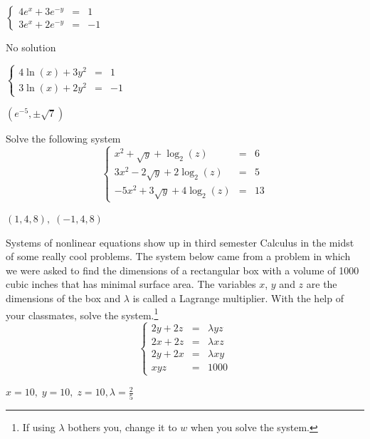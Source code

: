 \documentclass{ximera}
\begin{document}
\begin{question}
\begin{problem}
$\left\{\begin{array}{rcr}  4e^{x} + 3e^{-y} & = & 1 \\ 3e^{x} + 2e^{-y} & = & -1  \end{array} \right.$

\begin{solution}
    No solution
\end{solution}
\end{problem}

\begin{problem}\label{linearformlast}
$\left\{\begin{array}{rcr}  4\ln(x) + 3y^{2} & = & 1 \\ 3\ln(x) + 2y^{2} & = & -1 \end{array} \right.$   

\begin{solution}
    $\left( e^{-5}, \pm \sqrt{7} \right)$
\end{solution}
\end{problem}

\end{question}

\begin{problem}
Solve the following system \[\left\{\begin{array}{rcr}  x^{2} + \sqrt{y} + \log_{2}(z) & = & 6 \\[3pt] 3x^{2} - 2\sqrt{y} + 2\log_{2}(z) & = & 5 \\[3pt] -5x^{2} + 3\sqrt{y} + 4\log_{2}(z) & = & 13 \end{array} \right.\] 

\begin{solution}
    $(1, 4, 8), \; (-1, 4, 8)$
\end{solution}
\end{problem}

\begin{problem}
Systems of nonlinear equations show up in third semester Calculus in the midst of some really cool problems.  The system below came from a problem in which we were asked to find the dimensions of a rectangular box with a volume of 1000 cubic inches that has minimal surface area.  The variables $x$, $y$ and $z$ are the dimensions of the box and $\lambda$ is called a Lagrange multiplier.  With the help of your classmates, solve the system.\footnote{If using $\lambda$ bothers you, change it to $w$ when you solve the system.} \[\left\{\begin{array}{rcr}  2y + 2z & = & \lambda yz  \\ 2x + 2z & = & \lambda xz \\ 2y + 2x & = & \lambda xy \\ xyz & = & 1000 \end{array} \right.\]    

\begin{solution}
    $x = 10, \; y = 10, \; z = 10, \lambda = \frac{2}{5}$
\end{solution}
\end{problem}
\end{document}
